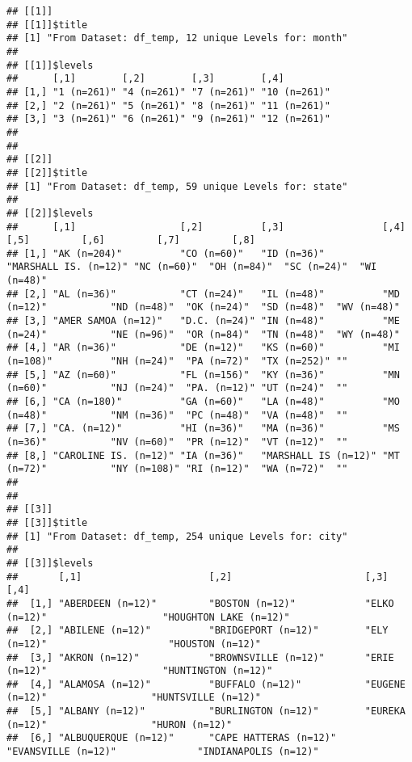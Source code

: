 \documentclass[
]{book}
\begin{document}
\begin{verbatim}
## [[1]]
## [[1]]$title
## [1] "From Dataset: df_temp, 12 unique Levels for: month"
## 
## [[1]]$levels
##      [,1]        [,2]        [,3]        [,4]        
## [1,] "1 (n=261)" "4 (n=261)" "7 (n=261)" "10 (n=261)"
## [2,] "2 (n=261)" "5 (n=261)" "8 (n=261)" "11 (n=261)"
## [3,] "3 (n=261)" "6 (n=261)" "9 (n=261)" "12 (n=261)"
## 
## 
## [[2]]
## [[2]]$title
## [1] "From Dataset: df_temp, 59 unique Levels for: state"
## 
## [[2]]$levels
##      [,1]                  [,2]          [,3]                 [,4]                  [,5]         [,6]         [,7]         [,8]       
## [1,] "AK (n=204)"          "CO (n=60)"   "ID (n=36)"          "MARSHALL IS. (n=12)" "NC (n=60)"  "OH (n=84)"  "SC (n=24)"  "WI (n=48)"
## [2,] "AL (n=36)"           "CT (n=24)"   "IL (n=48)"          "MD (n=12)"           "ND (n=48)"  "OK (n=24)"  "SD (n=48)"  "WV (n=48)"
## [3,] "AMER SAMOA (n=12)"   "D.C. (n=24)" "IN (n=48)"          "ME (n=24)"           "NE (n=96)"  "OR (n=84)"  "TN (n=48)"  "WY (n=48)"
## [4,] "AR (n=36)"           "DE (n=12)"   "KS (n=60)"          "MI (n=108)"          "NH (n=24)"  "PA (n=72)"  "TX (n=252)" ""         
## [5,] "AZ (n=60)"           "FL (n=156)"  "KY (n=36)"          "MN (n=60)"           "NJ (n=24)"  "PA. (n=12)" "UT (n=24)"  ""         
## [6,] "CA (n=180)"          "GA (n=60)"   "LA (n=48)"          "MO (n=48)"           "NM (n=36)"  "PC (n=48)"  "VA (n=48)"  ""         
## [7,] "CA. (n=12)"          "HI (n=36)"   "MA (n=36)"          "MS (n=36)"           "NV (n=60)"  "PR (n=12)"  "VT (n=12)"  ""         
## [8,] "CAROLINE IS. (n=12)" "IA (n=36)"   "MARSHALL IS (n=12)" "MT (n=72)"           "NY (n=108)" "RI (n=12)"  "WA (n=72)"  ""         
## 
## 
## [[3]]
## [[3]]$title
## [1] "From Dataset: df_temp, 254 unique Levels for: city"
## 
## [[3]]$levels
##       [,1]                      [,2]                       [,3]                             [,4]                        
##  [1,] "ABERDEEN (n=12)"         "BOSTON (n=12)"            "ELKO (n=12)"                    "HOUGHTON LAKE (n=12)"      
##  [2,] "ABILENE (n=12)"          "BRIDGEPORT (n=12)"        "ELY (n=12)"                     "HOUSTON (n=12)"            
##  [3,] "AKRON (n=12)"            "BROWNSVILLE (n=12)"       "ERIE (n=12)"                    "HUNTINGTON (n=12)"         
##  [4,] "ALAMOSA (n=12)"          "BUFFALO (n=12)"           "EUGENE (n=12)"                  "HUNTSVILLE (n=12)"         
##  [5,] "ALBANY (n=12)"           "BURLINGTON (n=12)"        "EUREKA (n=12)"                  "HURON (n=12)"              
##  [6,] "ALBUQUERQUE (n=12)"      "CAPE HATTERAS (n=12)"     "EVANSVILLE (n=12)"              "INDIANAPOLIS (n=12)"       

\end{verbatim}
\end{document}
